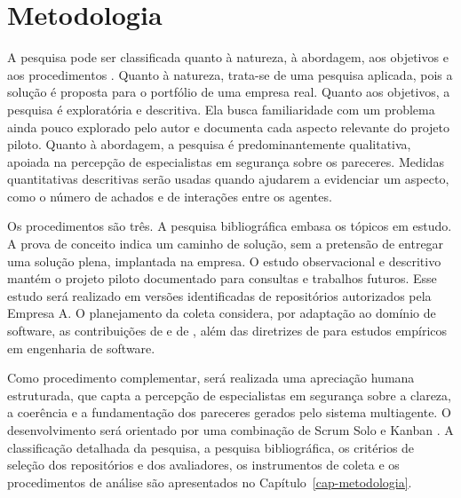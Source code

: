 \section{Metodologia}
\label{intro-metodologia}

A pesquisa pode ser classificada quanto à natureza, à abordagem, aos objetivos e aos procedimentos \cite{gerhardt2009,gil2002}. Quanto à natureza, trata-se de uma pesquisa aplicada, pois a solução é proposta para o portfólio de uma empresa real. Quanto aos objetivos, a pesquisa é exploratória e descritiva. Ela busca familiaridade com um problema ainda pouco explorado pelo autor e documenta cada aspecto relevante do projeto piloto. Quanto à abordagem, a pesquisa é predominantemente qualitativa, apoiada na percepção de especialistas em segurança sobre os pareceres. Medidas quantitativas descritivas serão usadas quando ajudarem a evidenciar um aspecto, como o número de achados e de interações entre os agentes.

Os procedimentos são três. A pesquisa bibliográfica embasa os tópicos em estudo. A prova de conceito indica um caminho de solução, sem a pretensão de entregar uma solução plena, implantada na empresa. O estudo observacional e descritivo mantém o projeto piloto documentado para consultas e trabalhos futuros. Esse estudo será realizado em versões identificadas de repositórios autorizados pela Empresa A. O planejamento da coleta considera, por adaptação ao domínio de software, as contribuições de  e de , além das diretrizes de  para estudos empíricos em engenharia de software.

Como procedimento complementar, será realizada uma apreciação humana estruturada, que capta a percepção de especialistas em segurança sobre a clareza, a coerência e a fundamentação dos pareceres gerados pelo sistema multiagente. O desenvolvimento será orientado por uma combinação de Scrum Solo \cite{pagotto2016} e Kanban \cite{boeg2010}. A classificação detalhada da pesquisa, a pesquisa bibliográfica, os critérios de seleção dos repositórios e dos avaliadores, os instrumentos de coleta e os procedimentos de análise são apresentados no Capítulo~\ref{cap-metodologia}.


